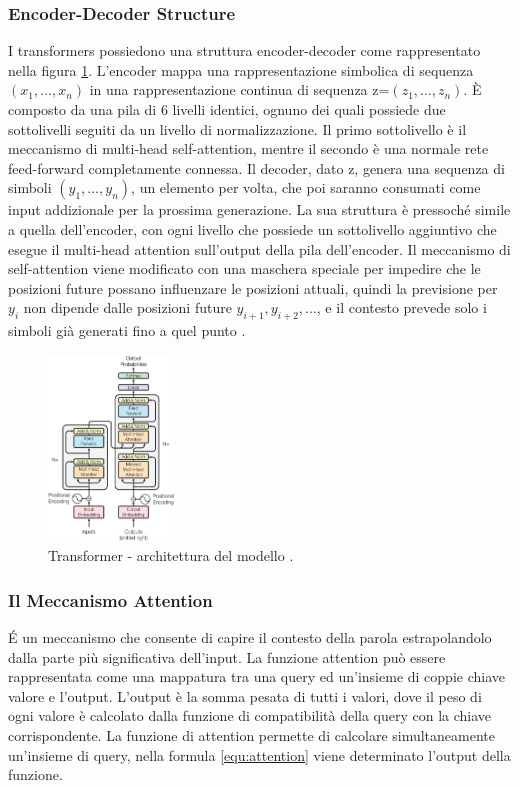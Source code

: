 \subsubsection{Encoder-Decoder Structure}
I transformers possiedono una struttura encoder-decoder come rappresentato nella figura \ref{fig:Transformer model}.
L'encoder mappa una rappresentazione simbolica di sequenza \((x_1, \ldots, x_n)\) in una rappresentazione continua di sequenza z=\((z_1, \ldots, z_n)\).
È composto da una pila di 6 livelli identici, ognuno dei quali possiede due sottolivelli seguiti da un livello di normalizzazione.
Il primo sottolivello è il meccanismo di multi-head self-attention, mentre il secondo è una normale rete feed-forward completamente connessa.
Il decoder, dato z, genera una sequenza di simboli \((y_1, \ldots, y_n)\), un elemento per volta, che poi saranno consumati come input addizionale per la prossima generazione. La sua struttura è pressoché simile a quella dell'encoder, con ogni livello che possiede un sottolivello aggiuntivo che esegue il multi-head attention sull'output della pila dell'encoder.
Il meccanismo di self-attention viene modificato con una maschera speciale per impedire che le posizioni future possano influenzare le posizioni attuali, quindi la previsione per \(y_i\) non dipende dalle posizioni future \( y_{i+1}, y_{i+2}, \ldots \), e il contesto prevede solo i simboli già generati fino a quel punto \cite{vaswani2017attention}.

\begin{figure}[ht]
	\centering
	\includegraphics[width=0.3\textwidth]{Immagini/transformers.png}
	\caption{Transformer - architettura del modello \cite{vaswani2017attention}.}
	\label{fig:Transformer model}
\end{figure}

\subsubsection {Il Meccanismo Attention}
É un meccanismo che consente di capire il contesto della parola estrapolandolo dalla parte più significativa dell'input.
La funzione attention può essere rappresentata come una mappatura tra una query ed un'insieme di coppie chiave valore e l'output.
L'output è la somma pesata di tutti i valori, dove il peso di ogni valore è calcolato dalla funzione di compatibilità della query con la chiave corrispondente.
La funzione di attention permette di calcolare simultaneamente un'insieme di query, nella formula \ref{equ:attention} viene determinato l'output della funzione.

